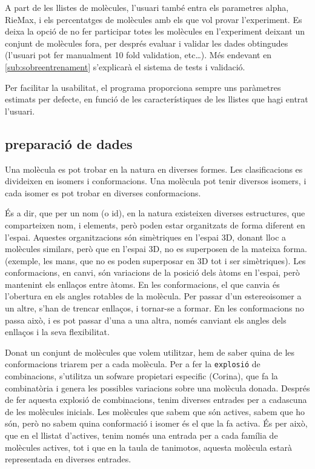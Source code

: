 \documentclass[titlepage,a4paper,12pt]{book}
\begin{document}
A part de les llistes de molècules, l'usuari també entra els parametres alpha,
RieMax, i els percentatges de molècules amb els que vol provar l'experiment.  Es
deixa la opció de no fer participar totes les molècules en l'experiment deixant 
un conjunt de molècules fora, per després evaluar i validar les dades obtingudes
(l'usuari pot fer manualment 10 fold validation, etc\dots).  Més endevant en 
\ref{sub:sobreentrenament} s'explicarà el sistema de tests i validació.

Per facilitar la usabilitat, el programa proporciona sempre uns paràmetres
estimats per defecte, en funció de les característiques de les llistes que hagi
entrat l'usuari. 

\subsection{preparació de dades} %
\label{sub:preparacio de dades}
Una molècula es pot trobar en la natura en diverses formes.  Les clasificacions
es divideixen en isomers i conformacions.  Una molècula pot tenir diversos
isomers, i cada isomer es pot trobar en  diverses conformacions.

És a dir, que per un nom (o id), en la natura existeixen diverses estructures, que
comparteixen nom, i elements, però poden estar organitzats de forma diferent en
l'espai. Aquestes organitzacions són simètriques en l'espai 3D, donant lloc a
molècules similars, però que en l'espai 3D, no es superposen de la mateixa
forma. (exemple, les mans, que no es poden superposar en 3D tot i ser
simètriques).  Les conformacions, en canvi, són variacions de la posició dels àtoms en l'espai,
però mantenint els enllaços entre àtoms. En les conformacions, el que canvia és
l'obertura en els angles rotables de la molècula.  
Per passar d'un estereoisomer a un altre, s'han de trencar enllaços, i tornar-se
a formar.  En les conformacions no passa això, i es pot passar d'una a una
altra, només canviant els angles dels enllaços i la seva flexibilitat. 

Donat un conjunt de molècules que volem utilitzar, hem de saber quina de les
conformacions triarem per a cada molècula.  Per a fer la \texttt{explosió} de
combinacions, s'utilitza un sofware propietari especific (Corina), que fa la
combinatòria i genera les possibles variacions sobre una molècula donada.
Després de fer aquesta explosió de combinacions, tenim diverses entrades per a
cadascuna de les molècules inicials.  Les molècules que sabem que són actives,
sabem que ho són, però no sabem quina conformació i isomer és el que la fa
activa.  És per això, que en el llistat d'actives, tenim només una entrada per a
cada família de molècules actives, tot i que en la taula de tanimotos, aquesta
molècula estarà representada en diverses entrades. 
\end{document}
